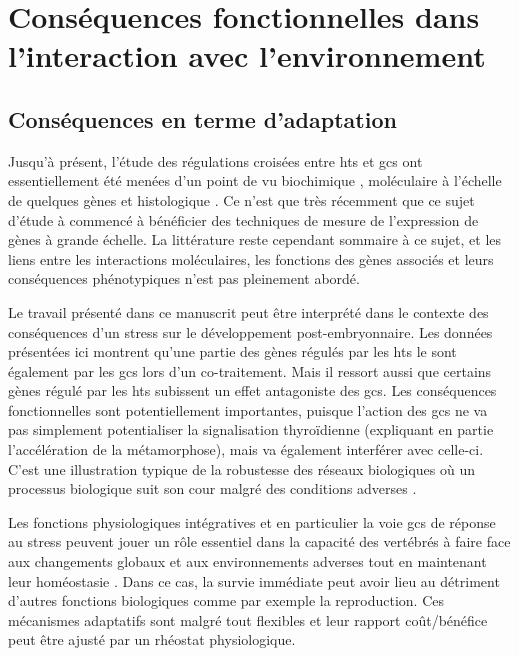 \documentclass[../main.tex]{subfiles}
\begin{document}
\chapter{Conséquences fonctionnelles dans l'interaction avec l'environnement}


\section{Conséquences en terme d'adaptation}

Jusqu'à présent, l'étude des régulations croisées entre \glspl{ht} et \glspl{gc} ont essentiellement été menées d'un point de vu biochimique \citep{Kikuyama1982,Galton1990}, moléculaire à l’échelle de quelques gènes \citep{Bagamasbad2008,Krain2004,Gil-Ibanez2014} et histologique \citep{Denver1993}.
Ce n’est que très récemment que ce sujet d'étude à commencé à bénéficier des techniques de mesure de l'expression de gènes à grande échelle.
La littérature reste cependant sommaire à ce sujet, et les liens entre les interactions moléculaires, les fonctions des gènes associés et leurs conséquences phénotypiques n'est pas pleinement abordé.
\par
Le travail présenté dans ce manuscrit peut être interprété dans le contexte des conséquences d'un stress sur le développement post-embryonnaire.
Les données présentées ici montrent qu'une partie des gènes régulés par les \glspl{ht} le sont également par les \glspl{gc} lors d'un co-traitement.
Mais il ressort aussi que certains gènes régulé par les \glspl{ht} subissent un effet antagoniste des \glspl{gc}.
Les conséquences fonctionnelles sont potentiellement importantes, puisque l'action des \glspl{gc} ne va pas simplement potentialiser la signalisation thyroïdienne (expliquant en partie l'accélération de la métamorphose), mais va également interférer avec celle-ci.
C'est une illustration typique de la robustesse des réseaux biologiques où un processus biologique suit son cour malgré des conditions adverses \citep{Kitano2004}.
\par
Les fonctions physiologiques intégratives et en particulier la voie \glspl{gc} de réponse au stress peuvent jouer un rôle essentiel dans la capacité des vertébrés à faire face aux changements globaux et aux environnements adverses tout en maintenant leur homéostasie \citep{Angelier2013}.
Dans ce cas, la survie immédiate peut avoir lieu au détriment d'autres fonctions biologiques comme par exemple la reproduction. Ces mécanismes adaptatifs sont malgré tout flexibles et leur rapport coût/bénéfice peut être ajusté par un rhéostat physiologique.
\end{document}
